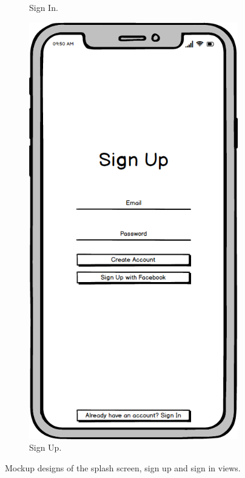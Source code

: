 \begin{figure}[H]
\begin{subfigure}[b]{0.3\textwidth}
        \caption{Sign In.}
        \label{fig:sign_in}
    \end{subfigure}
    \hfill
    \begin{subfigure}[b]{0.3\textwidth}
        \centering
        \includegraphics[width=\textwidth]{./graphics/design/Sign Up.png}
        \caption{Sign Up.}
        \label{fig:sign_up}
    \end{subfigure}
    
    \caption{Mockup designs of the splash screen, sign up and sign in views.}
    \label{fig:splash_signup_signin}
\end{figure}

